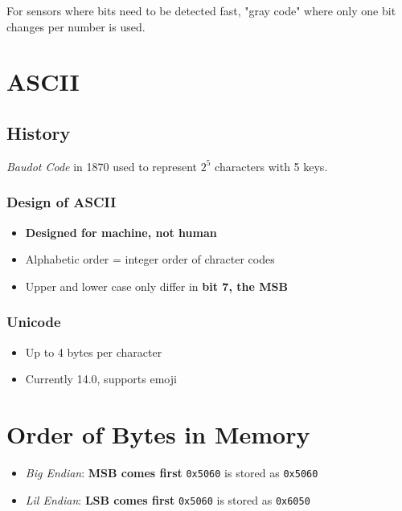 \documentclass[11pt]{article}
\begin{document}
For sensors where bits need to be detected fast, "gray code" where only one bit changes per number is used.

\section{ASCII}
\label{sec:org6eba12f}

\subsection{History}
\label{sec:orgbc2b5be}

\emph{Baudot Code} in 1870 used to represent \(2^5\) characters with 5 keys.

\subsubsection{Design of ASCII}
\label{sec:org96860ba}

\begin{itemize}
\item \textbf{Designed for machine, not human}
\item Alphabetic order = integer order of chracter codes
\item Upper and lower case only differ in \textbf{bit 7, the MSB}
\end{itemize}

\subsubsection{Unicode}
\label{sec:org6be04af}

\begin{itemize}
\item Up to 4 bytes per character
\item Currently 14.0, supports emoji
\end{itemize}

\section{Order of Bytes in Memory}
\label{sec:org9f571a1}

\begin{itemize}
\item \emph{Big Endian}: \textbf{MSB comes first}
\texttt{0x5060} is stored as \texttt{0x5060}
\item \emph{Lil Endian}: \textbf{LSB comes first}
\texttt{0x5060} is stored as \texttt{0x6050}
\end{itemize}
\end{document}
